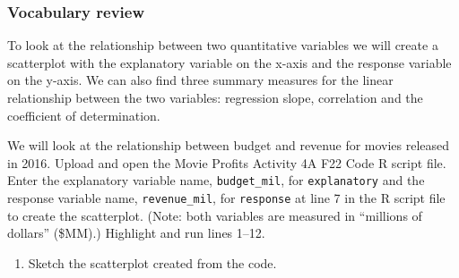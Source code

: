 \documentclass[
]{report}
\newenvironment{Shaded}{\begin{snugshade}}{\end{snugshade}}
\newcommand{\AttributeTok}[1]{\textcolor[rgb]{0.77,0.63,0.00}{#1}}
\newcommand{\CommentTok}[1]{\textcolor[rgb]{0.56,0.35,0.01}{\textit{#1}}}
\newcommand{\ConstantTok}[1]{\textcolor[rgb]{0.00,0.00,0.00}{#1}}
\newcommand{\FunctionTok}[1]{\textcolor[rgb]{0.00,0.00,0.00}{#1}}
\newcommand{\NormalTok}[1]{#1}
\newcommand{\SpecialCharTok}[1]{\textcolor[rgb]{0.00,0.00,0.00}{#1}}
\newcommand{\StringTok}[1]{\textcolor[rgb]{0.31,0.60,0.02}{#1}}
\providecommand{\tightlist}{%
  \setlength{\itemsep}{0pt}\setlength{\parskip}{0pt}}
\begin{document}
\hypertarget{vocabulary-review}{%
\subsubsection*{Vocabulary review}\label{vocabulary-review}}

To look at the relationship between two quantitative variables we will create a scatterplot with the explanatory variable on the x-axis and the response variable on the y-axis. We can also find three summary measures for the linear relationship between the two variables: regression slope, correlation and the coefficient of determination.

We will look at the relationship between budget and revenue for movies released in 2016. Upload and open the Movie Profits Activity 4A F22 Code R script file. Enter the explanatory variable name, \texttt{budget\_mil}, for \texttt{explanatory} and the response variable name, \texttt{revenue\_mil}, for \texttt{response} at line 7 in the R script file to create the scatterplot. (Note: both variables are measured in ``millions of dollars'' (\$MM).) Highlight and run lines 1--12.

\begin{Shaded}
\end{Shaded}

\begin{enumerate}
\def\labelenumi{\arabic{enumi}.}
\tightlist
\item
  Sketch the scatterplot created from the code.
\end{enumerate}
\end{document}
